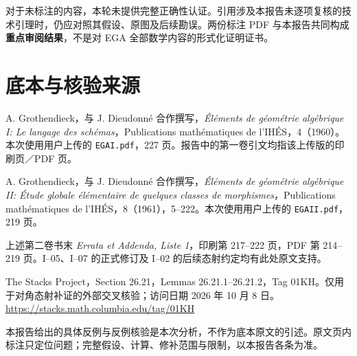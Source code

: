 对于未标注的内容，本轮未提供完整正确性认证。引用涉及本报告未逐项复核的技术引理时，仍应对照其假设、原图及后续勘误。两份标注 PDF 与本报告共同构成\textbf{重点审阅结果}，不是对 EGA 全部数学内容的形式化证明证书。


\chapter{底本与核验来源}
\begin{enumerate}[label={[\arabic*]},leftmargin=3em]
\item A. Grothendieck，与 J. Dieudonn\'e 合作撰写，\emph{Éléments de géométrie algébrique I: Le langage des schémas}，Publications mathématiques de l'IHÉS，4（1960）。本次使用用户上传的 \texttt{EGAI.pdf}，227 页。报告中的第一卷引文均指该上传版的印刷页／PDF 页。
\item A. Grothendieck，与 J. Dieudonn\'e 合作撰写，\emph{Éléments de géométrie algébrique II: Étude globale élémentaire de quelques classes de morphismes}，Publications mathématiques de l'IHÉS，8（1961），5--222。本次使用用户上传的 \texttt{EGAII.pdf}，219 页。
\item 上述第二卷书末 \emph{Errata et Addenda, Liste 1}，印刷第 217--222 页，PDF 第 214--219 页。I--05、I--07 的正式修订及 I--02 的后续态射约定均有此处原文支持。
\item The Stacks Project，Section 26.21，Lemmas 26.21.1--26.21.2，Tag 01KH。仅用于对角态射补证的外部交叉核验；访问日期 2026 年 10 月 8 日。\url{https://stacks.math.columbia.edu/tag/01KH}
\end{enumerate}
\par\bigskip
本报告给出的具体反例与反例核验是本次分析，不作为底本原文的引述。原文页内标注只定位问题；完整假设、计算、修补范围与限制，以本报告各条为准。
